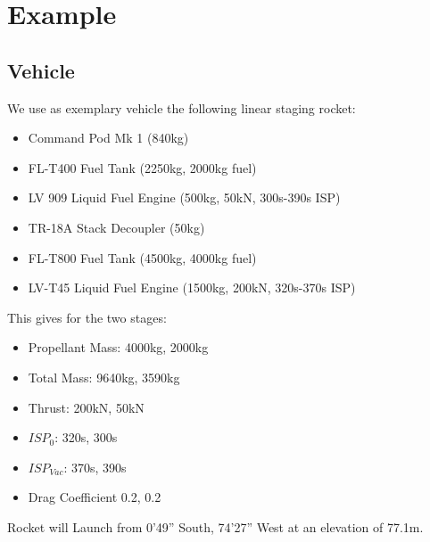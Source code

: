 \documentclass[11pt]{report}
\begin{document}
\chapter{Example}

\section{Vehicle}

We use as exemplary vehicle the following linear staging rocket:

\begin{itemize}
\item Command Pod Mk 1 (840kg)
\item FL-T400 Fuel Tank (2250kg, 2000kg fuel)
\item LV 909 Liquid Fuel Engine (500kg, 50kN, 300s-390s ISP)
\item TR-18A Stack Decoupler (50kg)
\item FL-T800 Fuel Tank (4500kg, 4000kg fuel)
\item LV-T45 Liquid Fuel Engine (1500kg, 200kN, 320s-370s ISP)
\end{itemize}

This gives for the two stages:

\begin{itemize}
\item Propellant Mass: 4000kg, 2000kg
\item Total Mass: 9640kg, 3590kg
\item Thrust: 200kN, 50kN
\item $ISP_0$: 320s, 300s
\item $ISP_{Vac}$: 370s, 390s
\item Drag Coefficient 0.2, 0.2
\end{itemize}

Rocket will Launch from 0'49'' South, 74'27'' West at an elevation of 77.1m.
\end{document}
